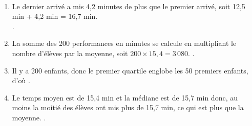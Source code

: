 \ \\ [-5mm]
\begin{enumerate}
   \item Le dernier arrivé a mis 4,2 minutes de plus que le premier arrivé, soit 12,5 min + 4,2 min = 16,7 min. \\
   .
   \item La somme des 200 performances en minutes se calcule en multipliant le nombre d'élèves par la moyenne, soit $200\times15,4 =3\,080$. .
   \item Il y a 200 enfants, donc le premier quartile englobe les 50 premiers enfants, d'où .
   \item Le temps moyen est de 15,4 min et la médiane est de 15,7 min donc, au moins la moitié des élèves ont mis plus de 15,7 min, ce qui est plus que la moyenne. .
\end{enumerate}
